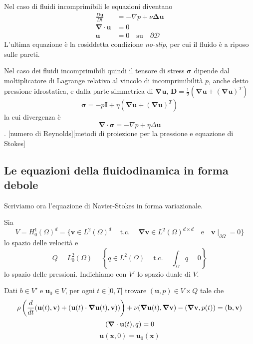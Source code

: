 \documentclass{book}
\newcommand{\Nabla}{\boldsymbol{\nabla}}
\newcommand{\tc}{\ \text{t.c.}\ }
\begin{document}
Nel caso di fluidi incomprimibili le equazioni diventano
\begin{equation}
\boxed{
\begin{aligned}
\frac{D\mathbf{u}}{Dt} &= - \nabla p + \nu \boldsymbol{\Delta} \mathbf{u} \\
\Nabla \cdot  \mathbf{u} &= 0 \\
\mathbf{u} &= 0 \quad \text{su} \quad \partial \mathcal{D}
\end{aligned}
}
\end{equation}
L'ultima equazione è la cosiddetta condizione \emph{no-slip}, per cui il fluido è a riposo sulle pareti.

Nel caso dei fluidi incomprimibili quindi il tensore di stress $\boldsymbol{\sigma}$ dipende dal moltiplicatore di Lagrange relativo al vincolo di incomprimibilità $p$, anche detto pressione idrostatica, e dalla parte simmetrica di $\Nabla\mathbf{u}$, $\mathbf{D}=\frac{1}{2}(\Nabla\mathbf{u}+(\Nabla\mathbf{u})^{T})$
$$\boldsymbol{\sigma}=-p\mathbf{I}+\eta(\Nabla\mathbf{u}+(\Nabla\mathbf{u})^{T})$$
la cui divergenza è
$$\Nabla\cdot\boldsymbol{\sigma}=-\nabla p+\eta\Delta\mathbf{u}$$.
[numero di Reynolds][metodi di proiezione per la pressione e equazione di Stokes]

\subsection{Le equazioni della fluidodinamica in forma debole}
Scriviamo ora l'equazione di Navier-Stokes in forma variazionale.

Sia
$$V = H^1_0(\Omega)^d = \bigg \{ \mathbf{v} \in L^2(\Omega)^d \quad \tc \quad \Nabla \mathbf{v} \in L^2(\Omega)^{d \times d} \quad \text{e} \quad \mathbf{v}\mid_{\partial \Omega} = 0 \bigg \} $$
lo spazio delle velocità e 
$$Q = L^2_0(\Omega) = \left  \{ q \in L^2(\Omega) \quad \tc \quad \int_{\Omega}q=0 \right  \}$$ lo spazio delle pressioni. Indichiamo con $V'$ lo spazio duale di $V$.

Dati $b \in V'$ e $\mathbf{u}_0 \in V$, per ogni $t \in ]0,T[$ trovare $(\mathbf{u},p) \in V \times Q$ tale che
\begin{multline*}
\rho \left ( \frac{d}{dt}\ps{\mathbf{u}(t)}{\mathbf{v}} + \ps{\mathbf{u}(t)\cdot \Nabla\mathbf{u}(t)}{\mathbf{v})}\right)+ \nu\ps{\Nabla\mathbf{u}(t)}{\Nabla\mathbf{v}}-\ps{\Nabla \mathbf{v}}{p(t)}=\ps{\mathbf{b}}{\mathbf{v}}
\end{multline*}
$$\ps{\Nabla\cdot\mathbf{u}(t)}{q}=0$$
$$\mathbf{u}(\mathbf{x},0)=\mathbf{u}_0(\mathbf{x})$$
\end{document}
